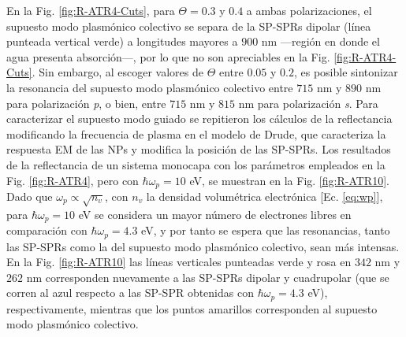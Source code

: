 En la Fig. \ref{fig:R-ATR4-Cuts}, para $\Theta = 0.3$ y $0.4$ a ambas polarizaciones, el supuesto modo plasmónico colectivo se separa de la SP-SPRs dipolar (línea punteada vertical verde) a longitudes mayores a $900$ nm ---región en donde el agua presenta absorción---, por lo que 
no son apreciables en la Fig. \ref{fig:R-ATR4-Cuts}. Sin embargo, al escoger valores de $\Theta$ entre $0.05$ y $0.2$, es posible sintonizar la resonancia del supuesto modo plasmónico colectivo entre $715$ nm y $890$ nm para polarización \emph{p}, o bien, entre $715$ nm y $815$ nm para polarización \emph{s}. Para caracterizar el supuesto modo guiado se repitieron los cálculos de la reflectancia modificando la frecuencia de plasma en el modelo de Drude, que caracteriza la respuesta EM de las NPs y modifica la posición de las SP-SPRs. Los resultados de la reflectancia de un sistema monocapa con los parámetros empleados en la Fig. \ref{fig:R-ATR4}, pero con $\hbar\omega_p = 10$ eV, se muestran en la Fig. \ref{fig:R-ATR10}. Dado que $\omega_p\propto\sqrt{n_v}$, con $n_v$ la densidad volumétrica electrónica [Ec. \eqref{eq:wp}], para $\hbar\omega_p = 10$ eV se considera un mayor número de electrones libres en comparación con $\hbar\omega_p=4.3$ eV, y por tanto se espera que las resonancias, tanto las SP-SPRs como la del supuesto modo plasmónico colectivo, sean más intensas. En la Fig. \ref{fig:R-ATR10} las líneas verticales punteadas verde y rosa en $342$ nm y $262$ nm corresponden nuevamente a las SP-SPRs dipolar y cuadrupolar (que se corren al azul respecto a las SP-SPR obtenidas con $\hbar\omega_p=4.3$ eV), respectivamente, mientras que los puntos amarillos corresponden al supuesto modo plasmónico colectivo.
				
